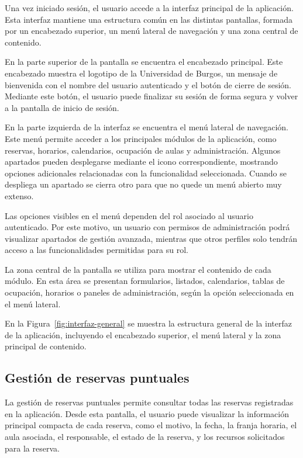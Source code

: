Una vez iniciado sesión, el usuario accede a la interfaz principal de la aplicación. Esta interfaz mantiene una estructura común en las distintas pantallas, formada por un encabezado superior, un menú lateral de navegación y una zona central de contenido.

En la parte superior de la pantalla se encuentra el encabezado principal. Este encabezado muestra el logotipo de la Universidad de Burgos, un mensaje de bienvenida con el nombre del usuario autenticado y el botón de cierre de sesión. Mediante este botón, el usuario puede finalizar su sesión de forma segura y volver a la pantalla de inicio de sesión.

En la parte izquierda de la interfaz se encuentra el menú lateral de navegación. Este menú permite acceder a los principales módulos de la aplicación, como reservas, horarios, calendarios, ocupación de aulas y administración. Algunos apartados pueden desplegarse mediante el icono correspondiente, mostrando opciones adicionales relacionadas con la funcionalidad seleccionada. Cuando se despliega un apartado se cierra otro para que no quede un menú abierto muy extenso.

Las opciones visibles en el menú dependen del rol asociado al usuario autenticado. Por este motivo, un usuario con permisos de administración podrá visualizar apartados de gestión avanzada, mientras que otros perfiles solo tendrán acceso a las funcionalidades permitidas para su rol.

La zona central de la pantalla se utiliza para mostrar el contenido de cada módulo. En esta área se presentan formularios, listados, calendarios, tablas de ocupación, horarios o paneles de administración, según la opción seleccionada en el menú lateral.

En la Figura~\ref{fig:interfaz-general} se muestra la estructura general de la interfaz de la aplicación, incluyendo el encabezado superior, el menú lateral y la zona principal de contenido.\\



\subsection{Gestión de reservas puntuales}

La gestión de reservas puntuales permite consultar todas las reservas registradas en la aplicación. Desde esta pantalla, el usuario puede visualizar la información principal compacta de cada reserva, como el motivo, la fecha, la franja horaria, el aula asociada, el responsable, el estado de la reserva, y los recursos solicitados para la reserva.

